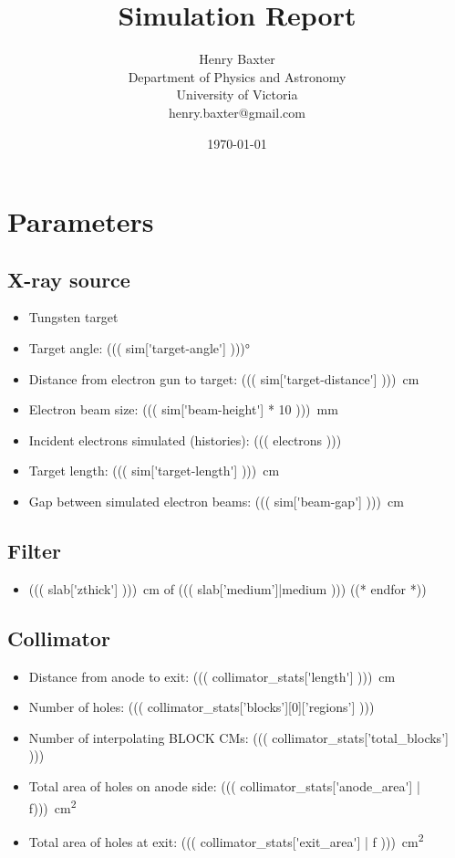 \documentclass[12pt]{article}
\title{Simulation Report}
\author{
        Henry Baxter \\
                Department of Physics and Astronomy\\
        University of Victoria\\
        henry.baxter@gmail.com
}
\date{\today}
\begin{document}
\maketitle

\tableofcontents

\section{Parameters}

\subsection{X-ray source}
\begin{itemize}
	\item Tungsten target
	\item Target angle: \ang{((( sim['target-angle'] )))}
	\item Distance from electron gun to target: \SI{((( sim['target-distance'] )))}{\cm}
	\item Electron beam size: \SI{((( sim['beam-height'] * 10 )))}{\mm}
	\item Incident electrons simulated (histories): ((( electrons )))
	\item Target length: \SI{((( sim['target-length'] )))}{\cm}
	\item Gap between simulated electron beams: \SI{((( sim['beam-gap'] )))}{\cm}
\end{itemize}

\subsection{Filter}
\begin{itemize}
	((* for slab in _filter['cms'][0]['slabs'] *))
	\item \SI{((( slab['zthick'] )))}{\cm} of ((( slab['medium']|medium )))
	((* endfor *))
\end{itemize}

\subsection{Collimator}
\begin{itemize}
	\item Distance from anode to exit: \SI{((( collimator_stats['length'] )))}{\cm}
	\item Number of holes: ((( collimator_stats['blocks'][0]['regions'] )))
	\item Number of interpolating BLOCK CMs: ((( collimator_stats['total_blocks'] )))
	\item Total area of holes on anode side: \SI{((( collimator_stats['anode_area'] | f)))}{\cm\squared}
	\item Total area of holes at exit: \SI{((( collimator_stats['exit_area'] | f )))}{\cm\squared}
\end{itemize}
\end{document}
